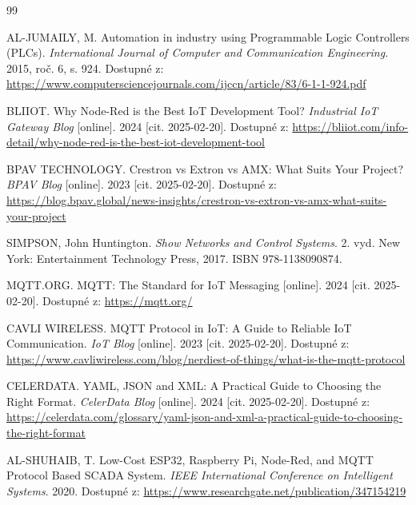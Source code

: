 \begin{thebibliography}{99}

    AL-JUMAILY, M. Automation in industry using Programmable Logic Controllers (PLCs). 
    \textit{International Journal of Computer and Communication Engineering}. 2015, roč. 6, s. 924. 
    Dostupné z: \url{https://www.computersciencejournals.com/ijccn/article/83/6-1-1-924.pdf}

    BLIIOT. Why Node-Red is the Best IoT Development Tool? 
    \textit{Industrial IoT Gateway Blog} [online]. 2024 [cit. 2025-02-20]. 
    Dostupné z: \url{https://bliiot.com/info-detail/why-node-red-is-the-best-iot-development-tool}

    BPAV TECHNOLOGY. Crestron vs Extron vs AMX: What Suits Your Project? 
    \textit{BPAV Blog} [online]. 2023 [cit. 2025-02-20]. 
    Dostupné z: \url{https://blog.bpav.global/news-insights/crestron-vs-extron-vs-amx-what-suits-your-project}

    SIMPSON, John Huntington. \textit{Show Networks and Control Systems}. 
    2. vyd. New York: Entertainment Technology Press, 2017. ISBN 978-1138090874.

    MQTT.ORG. MQTT: The Standard for IoT Messaging [online]. 
    2024 [cit. 2025-02-20]. Dostupné z: \url{https://mqtt.org/}

    CAVLI WIRELESS. MQTT Protocol in IoT: A Guide to Reliable IoT Communication. 
    \textit{IoT Blog} [online]. 2023 [cit. 2025-02-20]. 
    Dostupné z: \url{https://www.cavliwireless.com/blog/nerdiest-of-things/what-is-the-mqtt-protocol}

    CELERDATA. YAML, JSON and XML: A Practical Guide to Choosing the Right Format. 
    \textit{CelerData Blog} [online]. 2024 [cit. 2025-02-20]. 
    Dostupné z: \url{https://celerdata.com/glossary/yaml-json-and-xml-a-practical-guide-to-choosing-the-right-format}

    AL-SHUHAIB, T. Low-Cost ESP32, Raspberry Pi, Node-Red, and MQTT Protocol Based SCADA System. 
    \textit{IEEE International Conference on Intelligent Systems}. 2020. 
    Dostupné z: \url{https://www.researchgate.net/publication/347154219}


\end{thebibliography}
